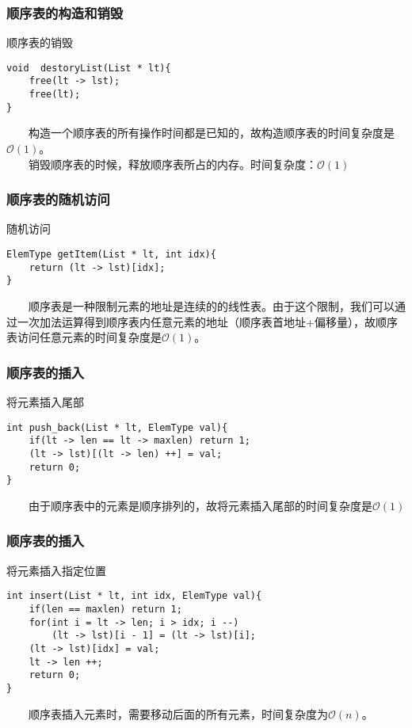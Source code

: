 \documentclass{beamer}
\begin{document}
	\begin{frame}[fragile]\frametitle{顺序表的构造和销毁}
	\begin{block}{顺序表的销毁}
\begin{verbatim}
void  destoryList(List * lt){
    free(lt -> lst);
    free(lt);
}
\end{verbatim}
	\end{block}
	\ \ \ \ 构造一个顺序表的所有操作时间都是已知的，故构造顺序表的时间复杂度是$\mathcal{O}(1)$。\\
	\ \ \ \ 销毁顺序表的时候，释放顺序表所占的内存。时间复杂度：$\mathcal{O}(1)$
\end{frame}
	\begin{frame}[fragile]\frametitle{顺序表的随机访问}
		\begin{block}{随机访问}
\begin{verbatim}
ElemType getItem(List * lt, int idx){
    return (lt -> lst)[idx];
}
\end{verbatim}
		\end{block}
		\ \ \ \ 顺序表是一种限制元素的地址是连续的的线性表。由于这个限制，我们可以通过一次加法运算得到顺序表内任意元素的地址（顺序表首地址+偏移量），故顺序表访问任意元素的时间复杂度是$\mathcal{O}(1)$。
	\end{frame}

	\begin{frame}[fragile]\frametitle{顺序表的插入}
		\begin{block}{将元素插入尾部}
\begin{verbatim}
int push_back(List * lt, ElemType val){
    if(lt -> len == lt -> maxlen) return 1;
    (lt -> lst)[(lt -> len) ++] = val;
    return 0;
}
\end{verbatim}
		\end{block}
		\ \ \ \ 由于顺序表中的元素是顺序排列的，故将元素插入尾部的时间复杂度是$\mathcal{O}(1)$
	\end{frame}

	\begin{frame}[fragile]\frametitle{顺序表的插入}
		\begin{block}{将元素插入指定位置}
\begin{verbatim}
int insert(List * lt, int idx, ElemType val){
    if(len == maxlen) return 1;
    for(int i = lt -> len; i > idx; i --)
        (lt -> lst)[i - 1] = (lt -> lst)[i];
    (lt -> lst)[idx] = val;
    lt -> len ++;
    return 0;
}
\end{verbatim}
		\end{block}
		\ \ \ \ 顺序表插入元素时，需要移动后面的所有元素，时间复杂度为$\mathcal{O}(n)$。
	\end{frame}
\end{document}
